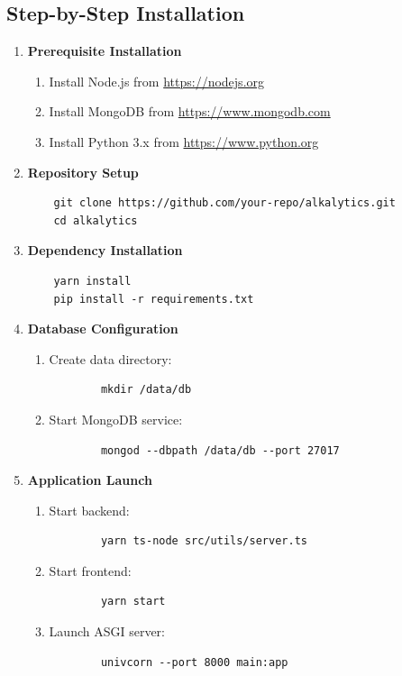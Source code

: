 \documentclass[12pt]{article}
\begin{document}
\subsection{Step-by-Step Installation}
\begin{enumerate}
    \item \textbf{Prerequisite Installation}
    \begin{enumerate}
        \item Install Node.js from \url{https://nodejs.org}
        \item Install MongoDB from \url{https://www.mongodb.com}
        \item Install Python 3.x from \url{https://www.python.org}
    \end{enumerate}
    
    \item \textbf{Repository Setup}
    \begin{verbatim}
    git clone https://github.com/your-repo/alkalytics.git
    cd alkalytics
    \end{verbatim}
    
    \item \textbf{Dependency Installation}
    \begin{verbatim}
    yarn install
    pip install -r requirements.txt
    \end{verbatim}
    
    \item \textbf{Database Configuration}
    \begin{enumerate}
        \item Create data directory:
        \begin{verbatim}
        mkdir /data/db
        \end{verbatim}
        \item Start MongoDB service:
        \begin{verbatim}
        mongod --dbpath /data/db --port 27017
        \end{verbatim}
    \end{enumerate}
    
    \item \textbf{Application Launch}
    \begin{enumerate}
        \item Start backend:
        \begin{verbatim}
        yarn ts-node src/utils/server.ts
        \end{verbatim}
        \item Start frontend:
        \begin{verbatim}
        yarn start
        \end{verbatim}
        \item Launch ASGI server:
        \begin{verbatim}
        univcorn --port 8000 main:app
        \end{verbatim}
    \end{enumerate}
\end{enumerate}
\end{document}
